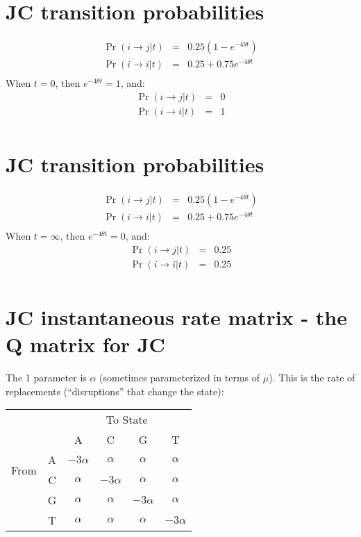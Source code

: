 \documentclass[landscape]{foils}
\newcommand{\disruption}{\theta}
\begin{document}
\myNewSlide
\section*{JC transition probabilities}
\begin{eqnarray*}
	\Pr(i\rightarrow j | t) & = & 0.25\left(1 - e^{-4\disruption t}\right) \\
	\Pr(i\rightarrow i | t) & = & 0.25 + 0.75e^{-4\disruption t} \\
\end{eqnarray*}
When $t = 0$, then $e^{-4\disruption t} = 1$, and:
\begin{eqnarray*}
	\Pr(i\rightarrow j | t) & = & 0 \\
	\Pr(i\rightarrow i | t) & = & 1 \\
\end{eqnarray*}

\myNewSlide
\section*{JC transition probabilities}
\begin{eqnarray*}
	\Pr(i\rightarrow j | t) & = & 0.25\left(1 - e^{-4\disruption t}\right) \\
	\Pr(i\rightarrow i | t) & = & 0.25 + 0.75e^{-4\disruption t} \\
\end{eqnarray*}
When $t = \infty$, then $e^{-4\disruption t} = 0$, and:
\begin{eqnarray*}
	\Pr(i\rightarrow j | t) & = & 0.25 \\
	\Pr(i\rightarrow i | t) & = & 0.25 \\
\end{eqnarray*}

\myNewSlide
 

\myNewSlide
\section*{JC instantaneous rate matrix - the Q matrix for JC}
The 1 parameter is $\alpha$ (sometimes parameterized in terms of $\mu$).
This is the rate of replacements (``disruptions'' that change the state):

\begin{table}[htdp]
\begin{center}
\begin{tabular}{cc|cccc}
& & \multicolumn{4}{c}{To State} \\
& & A & C & G & T \\
\hline
\multirow{2}{*}{From } & A &  $-3\alpha$ & $\alpha$ & $\alpha$ & $\alpha$    \\
\multirow{2}{*}{State } &C & $\alpha$ & $-3\alpha$ & $\alpha$ & $\alpha$    \\
 &G & $\alpha$ & $\alpha$ & $-3\alpha$ & $\alpha$    \\
 &T & $\alpha$ & $\alpha$ & $\alpha$ & $-3\alpha$    \\
\end{tabular}
\end{center}
\end{table}
\end{document}

